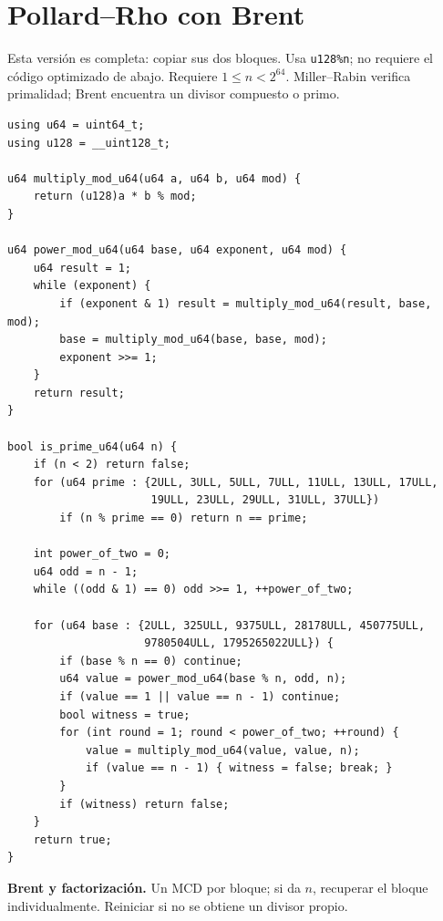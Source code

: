 \section{Pollard--Rho con Brent}

Esta versi\'on es completa: copiar sus dos bloques. Usa \texttt{u128\%n};
no requiere el c\'odigo optimizado de abajo. Requiere $1\le n<2^{64}$.
Miller--Rabin verifica primalidad; Brent encuentra un divisor compuesto o primo.

\begin{lstlisting}[style=cpp]
using u64 = uint64_t;
using u128 = __uint128_t;

u64 multiply_mod_u64(u64 a, u64 b, u64 mod) {
    return (u128)a * b % mod;
}

u64 power_mod_u64(u64 base, u64 exponent, u64 mod) {
    u64 result = 1;
    while (exponent) {
        if (exponent & 1) result = multiply_mod_u64(result, base, mod);
        base = multiply_mod_u64(base, base, mod);
        exponent >>= 1;
    }
    return result;
}

bool is_prime_u64(u64 n) {
    if (n < 2) return false;
    for (u64 prime : {2ULL, 3ULL, 5ULL, 7ULL, 11ULL, 13ULL, 17ULL,
                      19ULL, 23ULL, 29ULL, 31ULL, 37ULL})
        if (n % prime == 0) return n == prime;

    int power_of_two = 0;
    u64 odd = n - 1;
    while ((odd & 1) == 0) odd >>= 1, ++power_of_two;

    for (u64 base : {2ULL, 325ULL, 9375ULL, 28178ULL, 450775ULL,
                     9780504ULL, 1795265022ULL}) {
        if (base % n == 0) continue;
        u64 value = power_mod_u64(base % n, odd, n);
        if (value == 1 || value == n - 1) continue;
        bool witness = true;
        for (int round = 1; round < power_of_two; ++round) {
            value = multiply_mod_u64(value, value, n);
            if (value == n - 1) { witness = false; break; }
        }
        if (witness) return false;
    }
    return true;
}
\end{lstlisting}

\textbf{Brent y factorizaci\'on.} Un MCD por bloque; si da $n$, recuperar
el bloque individualmente. Reiniciar si no se obtiene un divisor propio.

